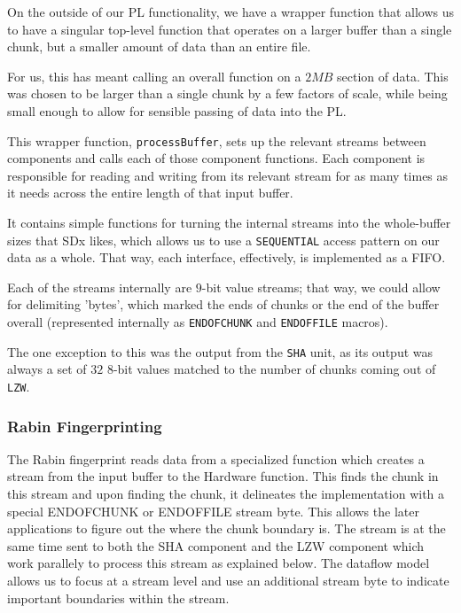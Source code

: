 \documentclass{article}
\begin{document}
On the outside of our PL functionality, we have a wrapper function that allows us to have a singular top-level function that operates on a larger buffer than a single chunk, but a smaller amount of data than an entire file.
\par
For us, this has meant calling an overall function on a $2{MB}$ section of data. This was chosen to be larger than a single chunk by a few factors of scale, while being small enough to allow for sensible passing of data into the PL.
\newline\par
This wrapper function, \texttt{processBuffer}, sets up the relevant streams between components and calls each of those component functions. 
Each component is responsible for reading and writing from its relevant stream for as many times as it needs across the entire length of that input buffer.
\par
It contains simple functions for turning the internal streams into the whole-buffer sizes that SDx likes, which allows us to use a \texttt{SEQUENTIAL} access pattern on our data as a whole. That way, each interface, effectively, is implemented as a FIFO.
\newline\par
Each of the streams internally are $9$-bit value streams; that way, we could allow for delimiting 'bytes', which marked the ends of chunks or the end of the buffer overall (represented internally as \texttt{ENDOFCHUNK} and \texttt{ENDOFFILE} macros).
\par
The one exception to this was the output from the \texttt{SHA} unit, as its output was always a set of $32$ 8-bit values matched to the number of chunks coming out of \texttt{LZW}.

\subsubsection{Rabin Fingerprinting}
The Rabin fingerprint reads data from a specialized function which creates a stream from the input buffer to the Hardware function. 
\newline
This finds the chunk in this stream and upon finding the chunk, it delineates the implementation with a special ENDOFCHUNK or ENDOFFILE stream byte. This allows the later applications to figure out the where the chunk boundary is. 
\newline
The stream is at the same time sent to both the SHA component and the LZW component which work parallely to process this stream as explained below.
\newline
The dataflow model allows us to focus at a stream level and use an additional stream byte to indicate important boundaries within the stream.
\newline
\end{document}
